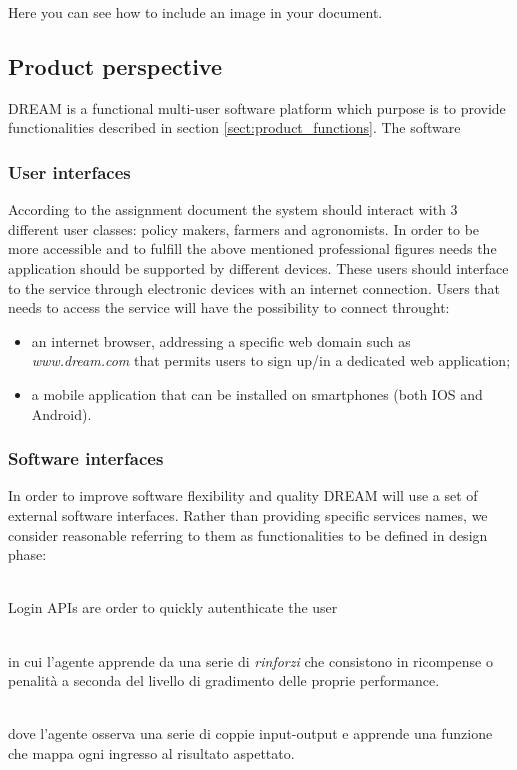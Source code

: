 Here you can see how to include an image in your document.

\subsection{Product perspective}
DREAM is a functional multi-user software platform which purpose is to provide functionalities described in section \ref{sect:product_functions}. The software 

\subsubsection{User interfaces} %
According to the assignment document the system should interact with 3 different user classes: policy makers, farmers and agronomists. In order to be more accessible and to fulfill the above mentioned professional figures needs the application should be supported by different devices. These users should interface to the service through electronic devices with an internet connection. Users that needs to access the service will have the possibility to connect throught:
\begin{itemize}
    \item an internet browser, addressing a specific web domain such as \textit{www.dream.com} that permits users to sign up/in a dedicated web application;
    \item a mobile application that can be installed on smartphones (both IOS and Android).
\end{itemize}


\subsubsection{Software interfaces}
In order to improve software flexibility and quality DREAM will use a set of external software interfaces. Rather than providing specific services names, we consider reasonable referring to them as functionalities to be defined in design phase:
\begin{description}[font=~\normalfont\scshape]
  \item[\textbf{Universal logins}:] \hfill \\Login APIs are order to quickly autenthicate the user
  \item[\textbf{reinforcement learning}:] \hfill \\in cui l'agente apprende da una serie di \textit{rinforzi} che consistono in ricompense o penalità a seconda del livello di gradimento delle proprie performance.
  \item[\textbf{supervised learning}:] \hfill \\dove l'agente osserva una serie di coppie input-output e apprende una funzione che mappa ogni ingresso al risultato aspettato.
\end{description}

